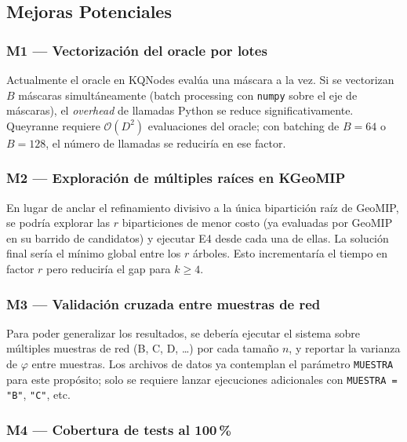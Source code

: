 \subsection{Mejoras Potenciales}


\subsubsection*{M1 — Vectorización del oracle por lotes}

Actualmente el oracle en KQNodes evalúa una máscara a la vez.
Si se vectorizan $B$ máscaras simultáneamente (batch processing con
\texttt{numpy} sobre el eje de máscaras), el \textit{overhead} de llamadas
Python se reduce significativamente.
Queyranne requiere $\mathcal{O}(D^2)$ evaluaciones del oracle; con batching
de $B=64$ o $B=128$, el número de llamadas se reduciría en ese factor.

\subsubsection*{M2 — Exploración de múltiples raíces en KGeoMIP}

En lugar de anclar el refinamiento divisivo a la única bipartición raíz
de GeoMIP, se podría explorar las $r$ biparticiones de menor costo
(ya evaluadas por GeoMIP en su barrido de candidatos) y ejecutar
E4 desde cada una de ellas.
La solución final sería el mínimo global entre los $r$ árboles.
Esto incrementaría el tiempo en factor $r$ pero reduciría el gap
para $k \geq 4$.

\subsubsection*{M3 — Validación cruzada entre muestras de red}

Para poder generalizar los resultados, se debería ejecutar el sistema
sobre múltiples muestras de red (B, C, D, \ldots) por cada tamaño $n$,
y reportar la varianza de $\varphi$ entre muestras.
Los archivos de datos ya contemplan el parámetro \texttt{MUESTRA} para
este propósito; solo se requiere lanzar ejecuciones adicionales con
\texttt{MUESTRA = "B"}, \texttt{"C"}, etc.

\subsubsection*{M4 — Cobertura de tests al 100\,\%}

